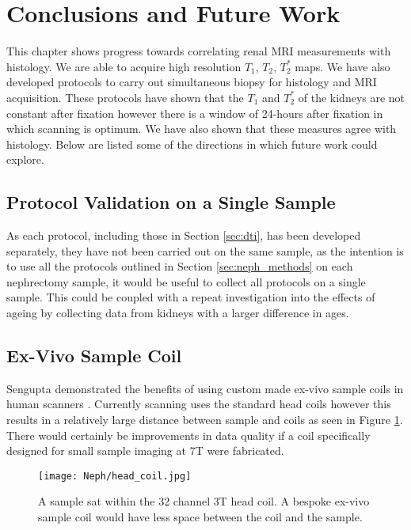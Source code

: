 \section{Conclusions and Future Work}

This chapter shows progress towards correlating renal \ac{MRI} measurements with histology. We are able to acquire high resolution $T_1$, $T_2$, $T_2^*$ maps. We have also developed protocols to carry out simultaneous biopsy for histology and \ac{MRI} acquisition. These protocols have shown that the $T_1$ and $T_2^*$ of the kidneys are not constant after fixation however there is a window of 24-hours after fixation in which scanning is optimum. We have also shown that these measures agree with histology. Below are listed some of the directions in which future work could explore.\\

\subsection{Protocol Validation on a Single Sample}

As each protocol, including those in Section \ref{sec:dti}, has been developed separately, they have not been carried out on the same sample, as the intention is to use all the protocols outlined in Section \ref{sec:neph_methods} on each nephrectomy sample, it would be useful to collect all protocols on a single sample. This could be coupled with a repeat investigation into the effects of ageing by collecting data from kidneys with a larger difference in ages.

\subsection{Ex-Vivo Sample Coil}
Sengupta demonstrated the benefits of using custom made ex-vivo sample coils in human scanners \cite{sengupta_high_2017}. Currently scanning uses the standard head coils however this results in a relatively large distance between sample and coils as seen in Figure \ref{fig:head_coil}. There would certainly be improvements in data quality if a coil specifically designed for small sample imaging at 7T were fabricated.
\begin{figure}[H]
	\centering
	\texttt{[image: Neph/head\_coil.jpg]}
	\caption{A sample sat within the 32 channel 3T head coil. A bespoke ex-vivo sample coil would have less space between the coil and the sample.}
	\label{fig:head_coil}	
\end{figure}

